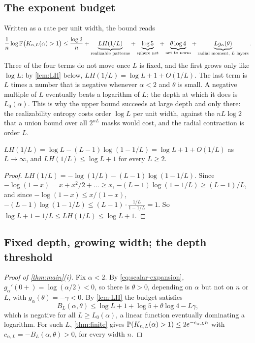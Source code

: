 \subsection{The exponent budget}
\label{sec:budget}

Written as a rate per unit width, the bound reads
\[
\frac1n\log\mathbb{P}\bigl(K_{n,L}(\alpha)>1\bigr)\le\frac{\log2}n+
\underbrace{LH(1/L)}_{\text{realizable patterns}}+\underbrace{\log5}_{\text{sphere net}}+\underbrace{\theta\log4}_{\text{net to norm}}+\underbrace{Lg_\alpha(\theta)}_{\text{radial moment, $L$ layers}} .
\]
Three of the four terms do not move once $L$ is fixed, and the first grows only like $\log L$: by \cref{lem:LH} below, $LH(1/L)=\log L+1+O(1/L)$. The last term is $L$ times a number that is negative whenever $\alpha<2$ and $\theta$ is small. A negative multiple of $L$ eventually beats a logarithm of $L$; the depth at which it does is $L_0(\alpha)$. This is why the upper bound succeeds at large depth and only there: the realizability entropy costs order $\log L$ per unit width, against the $nL\log2$ that a union bound over all $2^{nL}$ masks would cost, and the radial contraction is order $L$.

\begin{lemma}\label{lem:LH}
$LH(1/L)=\log L-(L-1)\log(1-1/L)=\log L+1+O(1/L)$ as $L\to\infty$, and $LH(1/L)\le\log L+1$ for every $L\ge2$.
\end{lemma}

\begin{proof}
$LH(1/L)=-\log(1/L)-(L-1)\log(1-1/L)$. Since $-\log(1-x)=x+x^2/2+\dots\ge x$, $-(L-1)\log(1-1/L)\ge(L-1)/L$, and since $-\log(1-x)\le x/(1-x)$, $-(L-1)\log(1-1/L)\le(L-1)\cdot\frac{1/L}{1-1/L}=1$. So $\log L+1-1/L\le LH(1/L)\le\log L+1$.
\end{proof}

\subsection{Fixed depth, growing width; the depth threshold}

\begin{proof}[Proof of \cref{thm:main}(i)]
Fix $\alpha<2$. By \cref{eq:scalar-expansion}, $g_\alpha'(0+)=\log(\alpha/2)<0$, so there is $\theta>0$, depending on $\alpha$ but not on $n$ or $L$, with $g_\alpha(\theta)=-\gamma<0$. By \cref{lem:LH} the budget satisfies
\[
B_L(\alpha,\theta)\le\log L+1+\log5+\theta\log4-L\gamma,
\]
which is negative for all $L\ge L_0(\alpha)$, a linear function eventually dominating a logarithm. For such $L$, \cref{thm:finite} gives $\mathbb{P}(K_{n,L}(\alpha)>1)\le2e^{-c_{\alpha,L}n}$ with $c_{\alpha,L}=-B_L(\alpha,\theta)>0$, for every width $n$.
\end{proof}

